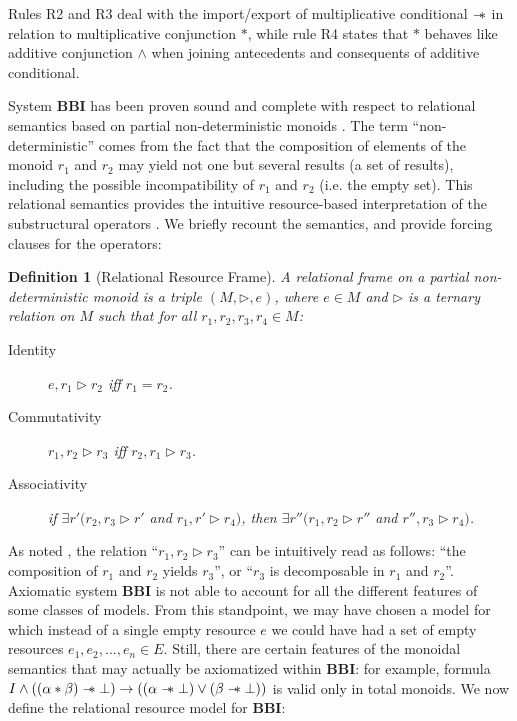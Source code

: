 \documentclass[a4paper]{article}
\newtheorem{definition}[theorem]{Definition}
\newcommand\magicwand{\mathrel{-\mkern-6mu*}}
\newcommand{\BBI}{\textbf{BBI}\xspace}
\begin{document}
Rules R2 and R3 deal with the import/export of multiplicative conditional $\magicwand$ in relation to multiplicative conjunction $*$, while rule R4 states that $*$ behaves like additive conjunction $\land$ when joining antecedents and consequents of additive conditional. 

System \BBI has been proven sound and complete with respect to relational semantics based on partial non-deterministic monoids \cite{galmiche_expressivity_2006}. The term ``non-deterministic'' comes from the fact that the composition of elements of the monoid $r_1$ and $r_2$ may yield not one but several results (a set of results), including the possible incompatibility of $r_1$ and $r_2$ (i.e. the empty set). This relational semantics provides the intuitive resource-based interpretation of the substructural operators \cite{pym_semantics_2002}. We briefly recount the semantics, and provide forcing clauses for the operators:

\begin{definition}[Relational Resource Frame]
    A relational frame on a partial non-deterministic monoid is a triple $(M, \triangleright, e)$, where $e \in M$ and $\triangleright$ is a ternary relation on $M$ such that for all $r_1,r_2,r_3,r_4 \in M$:

    \begin{description}
        \item[Identity] $e,r_1 \triangleright r_2$ iff $r_1=r_2$.
        \item[Commutativity] $r_1,r_2 \triangleright r_3$ iff $r_2,r_1 \triangleright r_3$.
        \item[Associativity] if $\exists r'(r_2,r_3 \triangleright r'$ and $r_1,r' \triangleright r_4)$, then $\exists r''(r_1,r_2 \triangleright r'' $ and $r'', r_3 \triangleright r_4) $.


    \end{description}
    
    
\end{definition}


As noted \cite{galmiche_expressivity_2006}, the relation ``$r_1, r_2\triangleright r_3$'' can be intuitively read as follows: ``the composition of $r_1$ and $r_2$ yields $r_3$'', or ``$r_3$ is decomposable in $r_1$ and $r_2$''. Axiomatic system \BBI is not able to account \cite{separation_theories} for all the different features of some classes of models. From this standpoint, we may have chosen a model for which instead of a single empty resource $e$ we could have had a set of empty resources $e_1,e_2,..., e_n \in E$. Still, there are certain features of the monoidal semantics that may actually be axiomatized within \BBI: for example, formula $I\land((\alpha*\beta)\magicwand \bot) \rightarrow ((\alpha \magicwand \bot)\lor (\beta \magicwand \bot))$ is valid only \cite{total_monoid_signature} in total monoids. We now define the relational resource model for \BBI:
\end{document}
